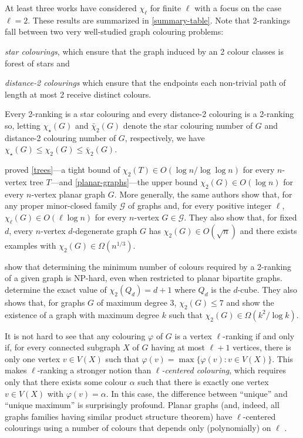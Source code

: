 \documentclass[kpfonts]{patmorin}
\newcommand{\trn}{\chi_2}
\newcommand{\dtcn}{\bar{\chi}_2}
\newcommand{\scn}{\chi_{\star}}
\theoremstyle{named}
\begin{document}
At least three works have considered $\chi_\ell$ for finite $\ell$ with a focus on the case $\ell=2$.  These results are summarized in \cref{summary-table}.  Note that 2-rankings fall between two very well-studied graph colouring problems:
\begin{compactitem}
    \item \emph{star colourings}, which ensure that the graph induced by an 2 colour classes is forest of stars and
    \item \emph{distance-2 colourings} which ensure that the endpoints each non-trivial path of length at most 2 receive distinct colours.
\end{compactitem}
Every 2-ranking is a star colouring and every distance-2 colouring is a 2-ranking so, letting $\scn(G)$ and $\dtcn(G)$ denote the star colouring number of $G$ and distance-2 colouring number of $G$, respectively, we have $\scn(G) \le \trn(G)\le \dtcn(G)$.

\citet{karpas.neiman.ea:on} proved \cref{trees}---a tight bound of $\trn(T)\in O(\log n/\log\log n)$ for every $n$-vertex tree $T$---and \cref{planar-graphs}---the upper bound $\trn(G)\in O(\log n)$ for every $n$-vertex planar graph $G$.  More generally, the same authors show that, for any proper minor-closed family $\mathcal{G}$ of graphs and, for every positive integer $\ell$, $\chi_\ell(G)\in O(\ell\log n)$ for every $n$-vertex $G\in\mathcal{G}$.  They also show that, for fixed $d$, every $n$-vertex $d$-degenerate graph $G$ has $\trn(G)\in O(\sqrt{n})$ and there exists examples with $\trn(G)\in\Omega(n^{1/3})$.

\citet{shalu.antony:complexity} show that determining the minimum number of colours required by a 2-ranking of a given graph is NP-hard, even when restricted to planar bipartite graphs.  \citet{almeter.demircan.ea:graph} determine the exact value of $\trn(Q_d)=d+1$ where $Q_d$ is the $d$-cube.  They also shows that, for graphs $G$ of maximum degree 3, $\trn(G)\le 7$ and show the existence of a graph with maximum degree $k$ such that $\trn(G)\in\Omega(k^2/\log k)$.

It is not hard to see that any colouring $\varphi$ of $G$ is a vertex $\ell$-ranking if and only if, for every connected subgraph $X$ of $G$ having at most $\ell+1$ vertices, there is only one vertex $v\in V(X)$ such that $\varphi(v)=\max\{\varphi(v):v\in V(X)\}$.  This makes $\ell$-ranking a stronger notion than \emph{$\ell$-centered colouring}, which requires only that there exists some colour $\alpha$ such that there is exactly one vertex $v\in V(X)$ with $\varphi(v)=\alpha$. In this case, the difference between ``unique'' and ``unique maximum'' is surprisingly profound.  Planar graphs (and, indeed, all graphs families having similar product structure theorem) have $\ell$-centered colourings using a number of colours that depends only (polynomially) on $\ell$ \cite{debski.felsner.ea:improved,pilipczuk.siebertz:polynomial}.
\end{document}
